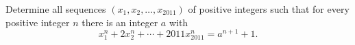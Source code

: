 Determine all sequences $(x_1, x_2, \ldots, x_{2011})$ of positive integers such that for every positive integer $n$ there is an integer $a$ with
\[ x_1^n + 2x_2^n + \cdots + 2011x_{2011}^n = a^{n+1} + 1. \]
